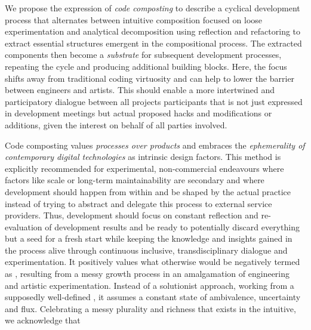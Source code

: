We propose the expression of \emph{code composting} to describe a cyclical development process that alternates between intuitive composition focused on loose experimentation and analytical decomposition using reflection and refactoring to extract essential structures emergent in the compositional process.
The extracted components then become a \emph{substrate} for subsequent development processes, repeating the cycle and producing additional building blocks.
Here, the focus shifts away from traditional coding virtuosity and can help to lower the barrier between engineers and artists.
This should enable a more intertwined and participatory dialogue between all project\textquotesingle s participants that is not just expressed in development meetings but actual proposed hacks and modifications or additions, given the interest on behalf of all parties involved.

Code composting values \emph{processes over products} and embraces the \emph{ephemerality of contemporary digital technologies} as intrinsic design factors.
This method is explicitly recommended for experimental, non-commercial endeavours where factors like scale or long-term maintainability are secondary and where development should happen from within and be shaped by the actual practice instead of trying to abstract and delegate this process to external service providers.
Thus, development should focus on constant reflection and re-evaluation of development results and be ready to potentially discard everything but a seed for a fresh start while keeping the knowledge and insights gained in the process alive through continuous inclusive, transdisciplinary dialogue and experimentation.
It positively values what otherwise would be negatively termed as , resulting from a messy growth process in an amalgamation of engineering and artistic experimentation.
Instead of a solutionist approach, working from a supposedly well-defined , it assumes a constant state of ambivalence, uncertainty and flux.
Celebrating a messy plurality and richness that exists in the intuitive, we acknowledge that \parencite[][55]{harawayStayingWithTheTrouble}

